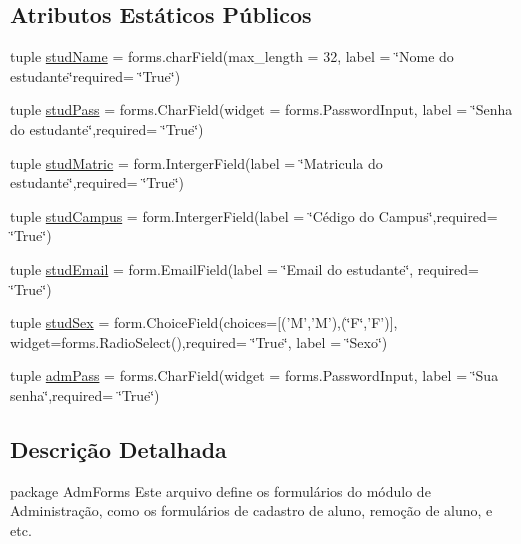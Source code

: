 \subsection*{Atributos Estáticos Públicos}
\begin{DoxyCompactItemize}
\item 
tuple \hyperlink{classAdm_1_1forms_1_1AdmRegStuForm_a148f5094b9746641dc5787e2d2f9b442}{stud\-Name} = forms.\-char\-Field(max\-\_\-length = 32, label = \char`\"{}Nome do estudante\char`\"{}required= \char`\"{}True\char`\"{})
\item 
tuple \hyperlink{classAdm_1_1forms_1_1AdmRegStuForm_a64f5a91780fe16298e824629a7315327}{stud\-Pass} = forms.\-Char\-Field(widget = forms.\-Password\-Input, label = \char`\"{}Senha do estudante\char`\"{},required= \char`\"{}True\char`\"{})
\item 
tuple \hyperlink{classAdm_1_1forms_1_1AdmRegStuForm_a3952916b9a15da1d6f5aef0fe70ca37a}{stud\-Matric} = form.\-Interger\-Field(label = \char`\"{}Matricula do estudante\char`\"{},required= \char`\"{}True\char`\"{})
\item 
tuple \hyperlink{classAdm_1_1forms_1_1AdmRegStuForm_ad626ad8ba2b3609252db029fba8112c1}{stud\-Campus} = form.\-Interger\-Field(label = \char`\"{}Cédigo do Campus\char`\"{},required= \char`\"{}True\char`\"{})
\item 
tuple \hyperlink{classAdm_1_1forms_1_1AdmRegStuForm_a7bb9d477582961bb017d459d7beb2a48}{stud\-Email} = form.\-Email\-Field(label = \char`\"{}Email do estudante\char`\"{}, required= \char`\"{}True\char`\"{})
\item 
tuple \hyperlink{classAdm_1_1forms_1_1AdmRegStuForm_a3a4118b48fa8d77ceb006cd7da92cfd6}{stud\-Sex} = form.\-Choice\-Field(choices=\mbox{[}('M','M'),(\char`\"{}F\char`\"{},'F')\mbox{]}, widget=forms.\-Radio\-Select(),required= \char`\"{}True\char`\"{}, label = \char`\"{}Sexo\char`\"{})
\item 
tuple \hyperlink{classAdm_1_1forms_1_1AdmRegStuForm_aa2463e5a3bdc53561cf1a1212099b8ca}{adm\-Pass} = forms.\-Char\-Field(widget = forms.\-Password\-Input, label = \char`\"{}Sua senha\char`\"{},required= \char`\"{}True\char`\"{})
\end{DoxyCompactItemize}


\subsection{Descrição Detalhada}
package Adm\-Forms Este arquivo define os formulários do módulo de Administração, como os formulários de cadastro de aluno, remoção de aluno, e etc. 

